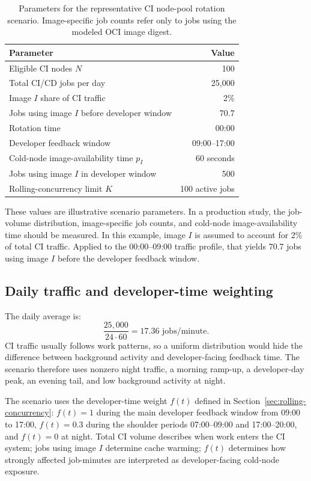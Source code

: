 \documentclass[11pt,a4paper]{article}
\begin{document}
\begin{table}[H]
\centering
\caption{Parameters for the representative CI node-pool rotation scenario. Image-specific job counts refer only to jobs using the modeled OCI image digest.}
\label{tab:main-scenario-parameters}
\small
\begin{tabular}{lr}
\toprule
Parameter & Value \\
\midrule
Eligible CI nodes \(N\) & 100 \\
Total CI/CD jobs per day & 25,000 \\
Image \(I\) share of CI traffic & 2\% \\
Jobs using image \(I\) before developer window & 70.7 \\
Rotation time & 00:00 \\
Developer feedback window & 09:00--17:00 \\
Cold-node image-availability time \(p_I\) & 60 seconds \\
Jobs using image \(I\) in developer window & 500 \\
Rolling-concurrency limit \(K\) & 100 active jobs \\
\bottomrule
\end{tabular}
\end{table}

These values are illustrative scenario parameters. In a production study, the job-volume distribution, image-specific job counts, and cold-node image-availability time should be measured. In this example, image \(I\) is assumed to account for 2\% of total CI traffic. Applied to the 00:00--09:00 traffic profile, that yields 70.7 jobs using image \(I\) before the developer feedback window.

\subsection{Daily traffic and developer-time weighting}

The daily average is:
\begin{equation}
  \frac{25{,}000}{24\cdot 60}=17.36 \text{ jobs/minute}.
\end{equation}
CI traffic usually follows work patterns, so a uniform distribution would hide the difference between background activity and developer-facing feedback time. The scenario therefore uses nonzero night traffic, a morning ramp-up, a developer-day peak, an evening tail, and low background activity at night.

The scenario uses the developer-time weight \(f(t)\) defined in Section~\ref{sec:rolling-concurrency}: \(f(t)=1\) during the main developer feedback window from 09:00 to 17:00, \(f(t)=0.3\) during the shoulder periods 07:00--09:00 and 17:00--20:00, and \(f(t)=0\) at night. Total CI volume describes when work enters the CI system; jobs using image \(I\) determine cache warming; \(f(t)\) determines how strongly affected job-minutes are interpreted as developer-facing cold-node exposure.
\end{document}
